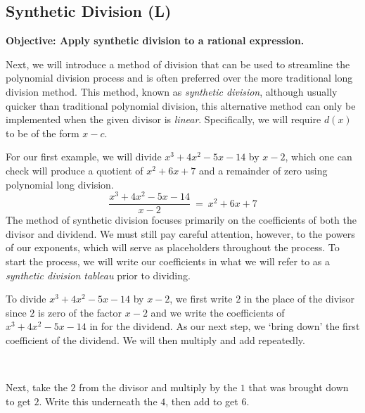 \documentclass[12pt]{book}
\theoremstyle{definition}
\begin{document}
\subsection{Synthetic Division (L)}
{\bf Objective: Apply synthetic division to a rational expression.}\par
Next, we will introduce a method of division that can be used to streamline the polynomial division process and is often preferred over the more traditional long division method.  This method, known as {\it synthetic division}, although usually quicker than traditional polynomial division, this alternative method can only be implemented when the given divisor is {\it linear}.  Specifically, we will require $d(x)$ to be of the form $x-c$.\par
For our first example, we will divide $x^3+4x^2-5x-14$ by $x-2$, which one can check will produce a quotient of $x^2+6x+7$ and a remainder of zero using polynomial long division.
$$\frac{x^3+4x^2-5x-14}{x-2}~=~x^2+6x+7$$
The method of synthetic division focuses primarily on the coefficients of both the divisor and dividend.  We must still pay careful attention, however, to the powers of our exponents, which will serve as placeholders throughout the process.
To start the process, we will write our coefficients in what we will refer to as a {\it synthetic division tableau} prior to dividing.\par  
To divide $x^3+4x^2-5x-14$ by $x-2$, we first write $2$ in the place of the divisor since $2$ is zero of the factor $x-2$ and we write the coefficients of $x^3+4x^2-5x-14$ in for the dividend.  As our next step, we `bring down' the first coefficient of the dividend.
We will then multiply and add repeatedly.
\begin{center}
\begin{multicols}{2}
\\
\end{multicols}
\end{center}

Next, take the $2$ from the divisor and multiply by the $1$ that was brought down to get $2$.  Write this underneath the $4$, then add to get $6$.

\begin{center}
\begin{multicols}{2}
\\
\end{multicols}
\end{center}
\end{document}
